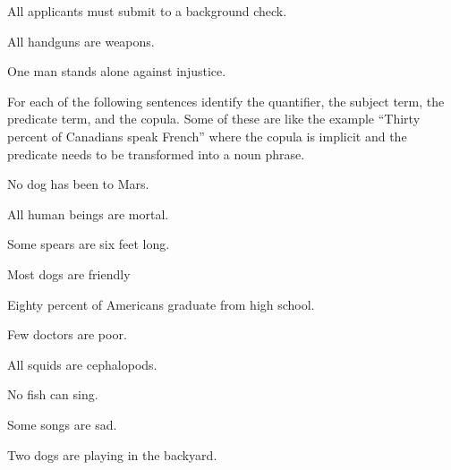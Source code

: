 \begin{exercises}
\item All applicants must submit to a background check. 

\item All handguns are weapons.

\item One man stands alone against injustice.

\end{exercises}



\noindent \problempart For each of the following sentences identify the quantifier, the subject term, the predicate term, and the copula. Some of these are like the example ``Thirty percent of Canadians speak French'' where the copula is implicit and the predicate needs to be transformed into a noun phrase. 

\begin{exercises}
\item No dog has been to Mars.

\item All human beings are mortal.

\item Some spears are six feet long.

\item Most dogs are friendly 

\item Eighty percent of Americans graduate from high school.

\item Few doctors are poor. 

\item All squids are cephalopods. 

\item No fish can sing.

\item Some songs are sad.

\item Two dogs are playing in the backyard.

\end{exercises}

